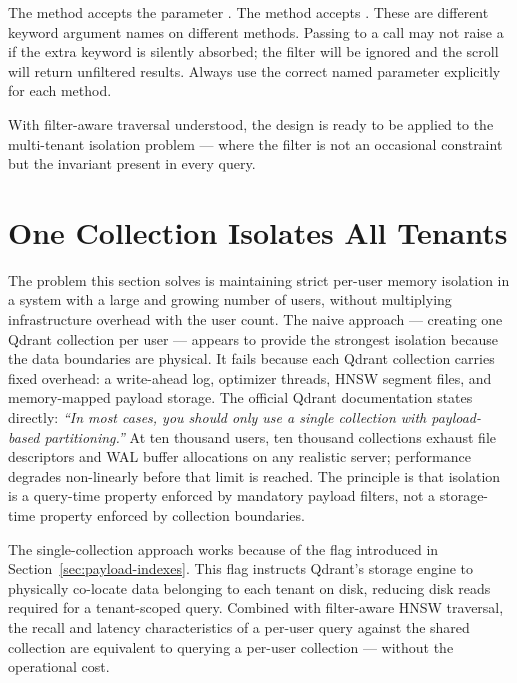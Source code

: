 \begin{warningbox}
The  method accepts the parameter .
The  method accepts . These are
different keyword argument names on different methods. Passing
 to a  call may not raise a
 if the extra keyword is silently absorbed; the filter
will be ignored and the scroll will return unfiltered results. Always
use the correct named parameter explicitly for each method.
\end{warningbox}

With filter-aware traversal understood, the design is ready to be applied to
the multi-tenant isolation problem --- where the  filter is
not an occasional constraint but the invariant present in every query.


\section{One Collection Isolates All Tenants}
\label{sec:multi-tenancy}

The problem this section solves is maintaining strict per-user memory
isolation in a system with a large and growing number of users, without
multiplying infrastructure overhead with the user count. The naive
approach --- creating one Qdrant collection per user --- appears to provide
the strongest isolation because the data boundaries are physical. It fails
because each Qdrant collection carries fixed overhead: a write-ahead log,
optimizer threads, HNSW segment files, and memory-mapped payload storage.
The official Qdrant documentation states directly: \emph{``In most cases,
you should only use a single collection with payload-based partitioning.''}
At ten thousand users, ten thousand collections exhaust file descriptors
and WAL buffer allocations on any realistic server; performance degrades
non-linearly before that limit is reached. The principle is that isolation
is a query-time property enforced by mandatory payload filters, not a
storage-time property enforced by collection boundaries.

The single-collection approach works because of the 
flag introduced in Section~\ref{sec:payload-indexes}. This flag instructs
Qdrant's storage engine to physically co-locate data belonging to each
tenant on disk, reducing disk reads required for a tenant-scoped query.
Combined with filter-aware HNSW traversal, the recall and latency
characteristics of a per-user query against the shared collection are
equivalent to querying a per-user collection --- without the operational cost.

